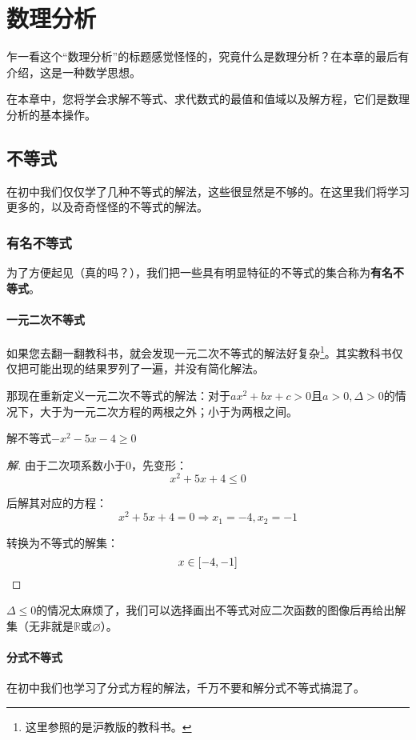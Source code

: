 \chapter{数理分析}
乍一看这个“数理分析”的标题感觉怪怪的，究竟什么是数理分析？在本章的最后有介绍，这是一种数学思想。

在本章中，您将学会求解不等式、求代数式的最值和值域以及解方程，它们是数理分析的基本操作。

\section{不等式}
在初中我们仅仅学了几种不等式的解法，这些很显然是不够的。在这里我们将学习更多的，以及奇奇怪怪的不等式的解法。

\subsection[有名]{有名不等式}
为了方便起见（真的吗？），我们把一些具有明显特征的不等式的集合称为\textbf{有名不等式}。

\subsubsection{一元二次不等式}
如果您去翻一翻教科书，就会发现一元二次不等式的解法好复杂\footnote{这里参照的是沪教版的教科书。}。其实教科书仅仅把可能出现的结果罗列了一遍，并没有简化解法。

那现在重新定义一元二次不等式的解法：对于$ax^2+bx+c>0$且$a>0,\Delta>0$的情况下，大于为一元二次方程的两根之外；小于为两根之间。

\begin{example}
	解不等式$-x^2-5x-4\geq0$
\end{example}
\begin{proof}[解]
	由于二次项系数小于$0$，先变形：\[x^2+5x+4\leq0\]

	后解其对应的方程：\[x^2+5x+4=0\Rightarrow x_1=-4,x_2=-1\]

	转换为不等式的解集：\[x\in[-4,-1]\qedhere\]
\end{proof}

$\Delta\leq0$的情况太麻烦了，我们可以选择画出不等式对应二次函数的图像后再给出解集（无非就是$\mathbb{R}$或$\varnothing$）。

\subsubsection{分式不等式}
在初中我们也学习了分式方程的解法，千万不要和解分式不等式搞混了。

